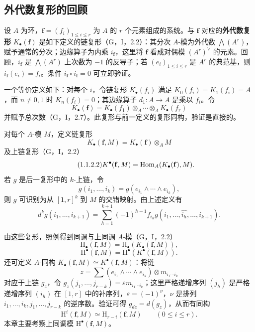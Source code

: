 \subsection{外代数复形的回顾}
设 $A$ 为环，$\mathbf f=(f_i)_{1\leq i\leq r}$ 为 $A$ 的 $r$ 个元素组成的系统。与 $\mathbf f$ 对应的\textbf{外代数复形} $K_\bullet(\mathbf f)$ 是如下定义的链复形（G，I，2.2）：其分次 $A$-模为外代数 $\bigwedge(A^r)$，赋予通常的分次；边缘算子为内乘 $i_{\mathbf f}$，这里将 $\mathbf f$ 看成对偶模 $(A^r)^\vee$ 的元素。回顾，$i_{\mathbf f}$ 是 $\bigwedge(A^r)$ 上次数为 $-1$ 的反导子；若 $(e_i)_{1\leq i\leq r}$ 是 $A^r$ 的典范基，则 $i_{\mathbf f}(e_i)=f_i$。条件 $i_{\mathbf f}\circ i_{\mathbf f}=0$ 可立即验证。

一个等价定义如下：对每个 $i$，令链复形 $K_\bullet(f_i)$ 满足 $K_0(f_i)=K_1(f_i)=A$，而 $n\ne0,1$ 时 $K_n(f_i)=0$；其边缘算子 $d_1:A\to A$ 是乘以 $f_i$。令
\[
K_\bullet(\mathbf f)=K_\bullet(f_1)\otimes_A\cdots\otimes_A K_\bullet(f_r)
\]
并赋予总次数（G，I，2.7）。此复形与前一定义的复形同构，验证是直接的。

对每个 $A$-模 $M$，定义链复形
\begin{equation}\tag{1.1.2.1}
K_\bullet(\mathbf f,M)=K_\bullet(\mathbf f)\otimes_AM
\end{equation}
及上链复形（G，I，2.2）
\begin{equation}\tag{1.1.2.2}
K^\bullet(\mathbf f,M)=\operatorname{Hom}_A(K_\bullet(\mathbf f),M).
\end{equation}
若 $g$ 是后一复形中的 $k$-上链，令
\[
g(i_1,\ldots,i_k)=g(e_{i_1}\wedge\cdots\wedge e_{i_k}),
\]
则 $g$ 可识别为从 $[1,r]^k$ 到 $M$ 的交错映射。由上述定义有
\begin{equation}\tag{1.1.2.3}
d^kg(i_1,\ldots,i_{k+1})=
\sum_{h=1}^{k+1}(-1)^{h-1}f_{i_h}g(i_1,\ldots,\widehat{i_h},\ldots,i_{k+1}).
\end{equation}

由这些复形，照例得到同调与上同调 $A$-模（G，I，2.2）
\begin{equation}\tag{1.1.3.1}
\mathrm H_\bullet(\mathbf f,M)=\mathrm H_\bullet(K_\bullet(\mathbf f,M)),
\end{equation}
\begin{equation}\tag{1.1.3.2}
\mathrm H^\bullet(\mathbf f,M)=\mathrm H^\bullet(K^\bullet(\mathbf f,M)).
\end{equation}
还可定义 $A$-同构 $K_\bullet(\mathbf f,M)\simeq K^\bullet(\mathbf f,M)$：将链
\[
z=\sum(e_{i_1}\wedge\cdots\wedge e_{i_k})\otimes m_{i_1\cdots i_k}
\]
对应于上链 $g_z$，令 $g_z(j_1,\ldots,j_{r-k})=\varepsilon m_{i_1\cdots i_k}$；这里严格递增序列 $(j_h)$ 是严格递增序列 $(i_h)$ 在 $[1,r]$ 中的补序列，$\varepsilon=(-1)^\nu$，$\nu$ 是排列 $i_1,\ldots,i_k,j_1,\ldots,j_{r-k}$ 的逆序数。验证可得 $g_{dz}=d(g_z)$，从而有同构
\begin{equation}\tag{1.1.3.3}
\mathrm H^i(\mathbf f,M)\simeq\mathrm H_{r-i}(\mathbf f,M)\qquad(0\leq i\leq r).
\end{equation}
本章主要考察上同调模 $\mathrm H^\bullet(\mathbf f,M)$。

